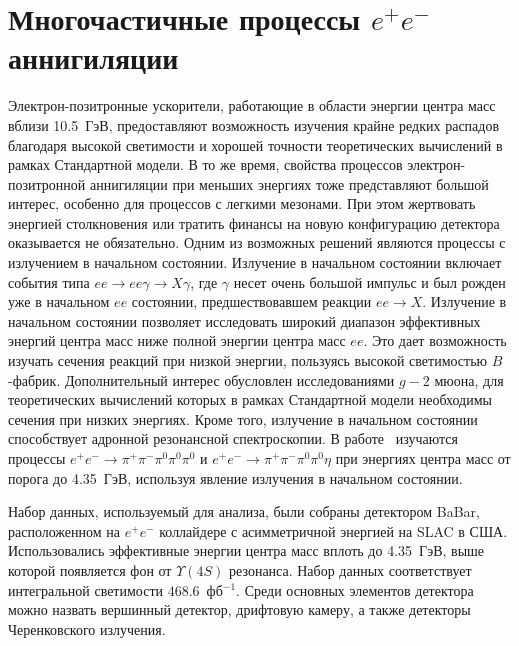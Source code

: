 \documentclass[a4paper, 12pt]{article}
\def\-{\nobreakdash-\hspace{0pt}}
\begin{document}

\clearpage
\section{Многочастичные процессы $e^+e^-$ аннигиляции}


Электрон\-позитронные ускорители, работающие в области энергии центра 
масс вблизи 10.5~ГэВ, предоставляют возможность изучения крайне редких 
распадов благодаря высокой светимости и хорошей точности теоретических 
вычислений в рамках Стандартной модели. В то же время, свойства 
процессов электрон\-позитронной аннигиляции при меньших энергиях тоже 
представляют большой интерес, особенно для процессов с легкими мезонами. 
При этом жертвовать энергией столкновения или тратить финансы на новую 
конфигурацию детектора оказывается не обязательно. Одним из возможных 
решений являются процессы с излучением в начальном состоянии.
%
Излучение в начальном состоянии включает события типа 
$ee\to{}ee\gamma\to{}X\gamma$, где $\gamma$ несет очень большой импульс 
и был рожден уже в начальном $ee$ состоянии, предшествовавшем реакции 
$ee\to{}X$.
%
Излучение в начальном состоянии позволяет исследовать широкий диапазон 
эффективных энергий центра масс ниже полной энергии центра масс $ee$.
%
Это дает возможность изучать сечения реакций при низкой энергии, 
пользуясь высокой светимостью {$B$-фабрик}. Дополнительный интерес 
обусловлен исследованиями $g-2$ мюона, для теоретических вычислений 
которых в рамках Стандартной модели необходимы сечения при низких 
энергиях.
%
Кроме того, излучение в начальном состоянии способствует адронной 
резонансной спектроскопии.
%
В работе~\cite{3-babar-5pi} изучаются процессы
$e^+e^- \rightarrow \pi^+\pi^-\pi^0\pi^0\pi^0$ и
$e^+e^- \rightarrow \pi^+\pi^-\pi^0\pi^0\eta$
при энергиях центра масс от порога до 4.35~ГэВ, используя явление 
излучения в начальном состоянии.

Набор данных, используемый для анализа, были собраны детектором BaBar, 
расположенном на $e^+e^-$ коллайдере с асимметричной энергией на SLAC 
в США. Использовались эффективные энергии центра масс вплоть до 
4.35~ГэВ, выше которой появляется фон от $\Upsilon(4S)$ резонанса. Набор 
данных соответствует интегральной светимости $468.6$~фб$^{-1}$. Среди 
основных элементов детектора можно назвать вершинный детектор, дрифтовую 
камеру, а также детекторы Черенковского излучения.
\end{document}
